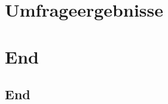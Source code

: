 \documentclass[hyperref={pdfpagelabels=false},usepdftitle=false]{beamer}
\begin{document}

\title{\titleText}
\subtitle{Pretest zur Umfrage \enquote{Textsetzung mathematischer Formeln} von Martin Thoma}
\author{\tutor}
\date{10. Januar 2015}

\frame{\titlepage}



\section{Umfrageergebnisse}


\section*{End}
\subsection{End}

\end{document}
